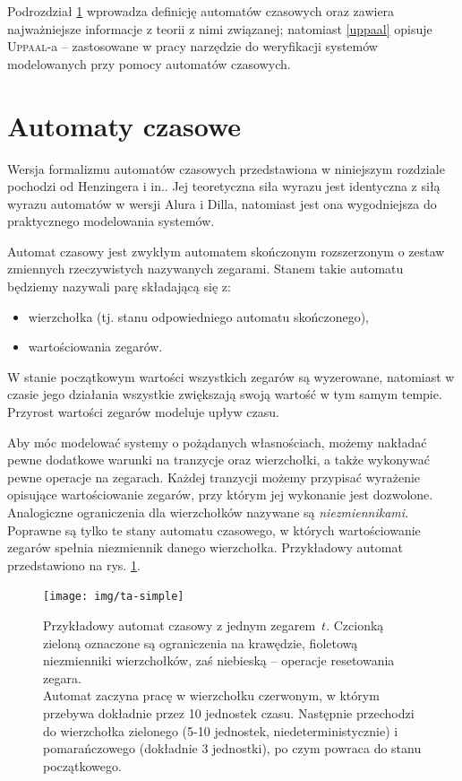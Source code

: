 \documentclass{pracamgr}
\newcommand{\upp}{\textsc{Uppaal}}
\theoremstyle{plain}
\begin{document}
Podrozdział \ref{ta-theory} wprowadza definicję automatów czasowych
oraz zawiera najważniejsze informacje z teorii z nimi związanej;
natomiast \ref{uppaal} opisuje \upp-a -- zastosowane w pracy narzędzie
do weryfikacji systemów modelowanych przy pomocy automatów czasowych.

\section{Automaty czasowe}
\label{ta-theory}

Wersja formalizmu automatów czasowych przedstawiona w niniejszym
rozdziale pochodzi od Henzingera i in.\cite{henz-94}. Jej teoretyczna
siła wyrazu jest identyczna z siłą wyrazu automatów w wersji Alura i
Dilla, natomiast jest ona wygodniejsza do praktycznego modelowania
systemów.

Automat czasowy jest zwykłym automatem skończonym rozszerzonym o
zestaw zmiennych rzeczywistych nazywanych zegarami. Stanem takie
automatu będziemy nazywali parę składającą się z:
\begin{itemize}
  \item wierzchołka (tj. stanu odpowiedniego automatu skończonego),
  \item wartościowania zegarów.
\end{itemize}
W stanie początkowym wartości wszystkich zegarów są wyzerowane,
natomiast w czasie jego działania wszystkie zwiększają swoją wartość w
tym samym tempie. Przyrost wartości zegarów modeluje upływ czasu.

Aby móc modelować systemy o pożądanych własnościach, możemy nakładać
pewne dodatkowe warunki na tranzycje oraz wierzchołki, a także
wykonywać pewne operacje na zegarach. Każdej tranzycji możemy
przypisać wyrażenie opisujące wartościowanie zegarów, przy którym jej
wykonanie jest dozwolone. Analogiczne ograniczenia dla wierzchołków
nazywane są \emph{niezmiennikami}. Poprawne są tylko te stany automatu
czasowego, w których wartościowanie zegarów spełnia niezmiennik danego
wierzchołka. Przykładowy automat przedstawiono na
rys. \ref{img:ta-simple}.

\begin{figure}
  \centering
  \texttt{[image: img/ta-simple]}
  \caption {Przykładowy automat czasowy z jednym zegarem~$t$.
    Czcionką zieloną oznaczone są ograniczenia na krawędzie, fioletową
    niezmienniki wierzchołków, zaś niebieską -- operacje resetowania
    zegara.\\ Automat zaczyna pracę w wierzchołku czerwonym, w którym
    przebywa dokładnie przez 10 jednostek czasu. Następnie przechodzi
    do wierzchołka zielonego (5-10 jednostek, niedeterministycznie) i
    pomarańczowego (dokładnie 3 jednostki), po czym powraca do stanu
    początkowego.}
  \label{img:ta-simple}
\end{figure}
\end{document}
